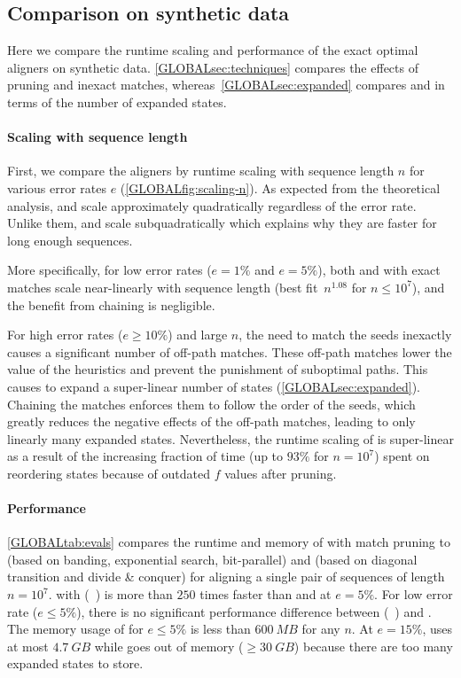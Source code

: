 \subsection{Comparison on synthetic data} \label{GLOBALsec:evals-comparison-synthetic}

Here we compare the runtime scaling and performance of the exact optimal
aligners on synthetic data.
\cref{GLOBALsec:techniques} compares the effects of pruning and inexact matches,
whereas~\cref{GLOBALsec:expanded} compares \SH and \CSH in terms of the number of
expanded states.

\paragraph{Scaling with sequence length}
First, we compare the aligners by runtime scaling with sequence length $n$ for
various error rates $e$ (\cref{GLOBALfig:scaling-n}). As expected from the theoretical
analysis, \edlib and \wfa scale approximately quadratically regardless of the
error rate. Unlike them, \SH and \CSH scale subquadratically which explains why
they are faster for long enough sequences.

More specifically, for low error rates ($e{=}1\%$ and $e{=}5\%$), both \SH and
\CSH with exact matches scale near-linearly with sequence length (best
fit~$n^{1.08}$ for \mbox{$n{\le}10^7$}), and the benefit from chaining is
negligible.

For high error rates ($e{\geq}10\%$) and large $n$, the need to match the seeds
inexactly causes a significant number of off-path matches. These off-path
matches lower the value of the heuristics and prevent the punishment of
suboptimal paths. This causes \SH to expand a super-linear number of states
(\cref{GLOBALsec:expanded}). Chaining the matches enforces them
to follow the order of the seeds, which greatly reduces the negative effects of
the off-path matches, leading to only linearly many expanded states.
Nevertheless, the runtime scaling of \CSH
is super-linear as a result of the increasing fraction of time (up to $93\%$ for
$n{=}10^7$) spent on reordering states because of outdated $f$ values after
pruning.

\paragraph{Performance}
\cref{GLOBALtab:evals} compares the runtime and memory of \astarpa with match
pruning to \edlib (based on banding, exponential search, bit-parallel) and \wfa
(based on diagonal transition and divide \& conquer) for aligning a single pair
of sequences of length $n{=}10^7$. \A with \CSH (\cshsymbol~\cshsymbolsq) is
more than $250$ times faster than \edlib and \wfa at $e{=}5\%$. For low error
rate ($e{\leq}5\%$), there is no significant performance difference between \SH
(\shsymbol~\shsymbolsq) and \CSH. The memory usage of \astarpa for $e{\leq}5\%$
is less than $\qty{600}{MB}$ for any $n$. At $e{=}15\%$, \CSH uses at most
$\qty{4.7}{GB}$ while \SH goes out of memory ($\geq\qty{30}{GB}$) because there
are too many expanded states to store.

   
